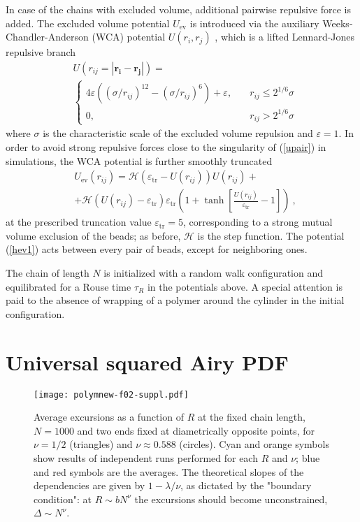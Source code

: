 \documentclass[aps,pre,floatfix,twocolumn,nofootinbib]{revtex4-2}
\newcommand{\eq}[1]{(\ref{#1})}
\begin{document}
In case of the chains with excluded volume, additional pairwise repulsive force is added. The excluded volume potential $U_{\mathrm{ev}}$ is introduced via the auxiliary Weeks-Chandler-Anderson (WCA) potential $U(r_i, r_j)$ \cite{weeks71,kremer90}, which is a lifted Lennard-Jones repulsive branch
\begin{equation}
\begin{split}
&U(r_{ij}=|\mathbf{r_{i}}-\mathbf{r_{j}}|) = \\
&\begin{cases}
    4 \varepsilon\left((\sigma/r_{ij})^{12} - (\sigma/r_{ij})^6 \right)+\varepsilon, \quad & \text{$r_{ij}\leq 2^{1/6}\sigma$} \\
    0,                 & \text{$r_{ij} > 2^{1/6} \sigma$}
\end{cases}
\end{split}
\label{upair}
\end{equation}
where $\sigma$ is the characteristic scale of the excluded volume repulsion and $\varepsilon=1$. In order to avoid strong repulsive forces close to the singularity of \eq{upair} in simulations, the WCA potential is further smoothly truncated
\begin{equation}
\begin{split}
&U_{\mathrm{ev}}(r_{ij}) =\mathcal{H}(\varepsilon_{\mathrm{tr}}-U(r_{ij}))U(r_{ij}) + \\ & + \mathcal{H}(U(r_{ij})-\varepsilon_{\mathrm{tr}}) \varepsilon_{\mathrm{tr}} \left(1 + \tanh \left[\frac{U(r_{ij})}{\varepsilon_{\mathrm{tr}}}-1\right]\right)  \ ,
\end{split}
\label{hev1}
\end{equation}
at the prescribed truncation value $\varepsilon_{\mathrm{tr}}=5$, corresponding to a strong mutual volume exclusion of the beads; as before, $\mathcal{H}$ is the step function. The potential \eq{hev1} acts between every pair of beads, except for neighboring ones.

The chain of length $N$ is initialized with a random walk configuration and equilibrated for a Rouse time $\tau_R$ in the potentials above. A special attention is paid to the absence of wrapping of a polymer around the cylinder in the initial configuration.

\section{Universal squared Airy PDF}\label{app_airy}

\begin{figure}
\texttt{[image: polymnew-f02-suppl.pdf]}
  \caption{Average excursions as a function of $R$ at the fixed chain length, $N=1000$ and two ends fixed at diametrically opposite points, for $\nu=1/2$ (triangles) and $\nu\approx 0.588$ (circles). Cyan and orange symbols show results of independent runs performed for each $R$ and $\nu$; blue and red symbols are the averages. The theoretical slopes of the dependencies are given by $1-\lambda/\nu$, as dictated by the "boundary condition": at $R\sim b N^\nu$ the excursions should become unconstrained, $\Delta \sim N^{\nu}$.}
  \label{fig:distrs}
\end{figure}
\end{document}
